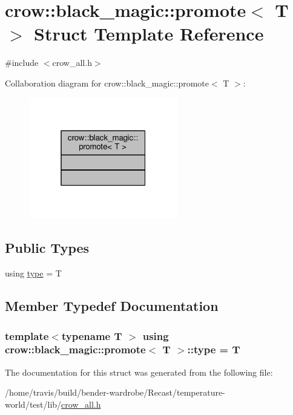 \hypertarget{structcrow_1_1black__magic_1_1promote}{\section{crow\-:\-:black\-\_\-magic\-:\-:promote$<$ T $>$ Struct Template Reference}
\label{structcrow_1_1black__magic_1_1promote}
}


{\ttfamily \#include $<$crow\-\_\-all.\-h$>$}



Collaboration diagram for crow\-:\-:black\-\_\-magic\-:\-:promote$<$ T $>$\-:
\nopagebreak
\begin{figure}[H]
\begin{center}
\leavevmode
\includegraphics[width=184pt]{structcrow_1_1black__magic_1_1promote__coll__graph}
\end{center}
\end{figure}
\subsection*{Public Types}
\begin{DoxyCompactItemize}
\item 
using \hyperlink{structcrow_1_1black__magic_1_1promote_a82cd625db63e2e5d3988ae220121cb32}{type} = T
\end{DoxyCompactItemize}


\subsection{Member Typedef Documentation}
\hypertarget{structcrow_1_1black__magic_1_1promote_a82cd625db63e2e5d3988ae220121cb32}{
\subsubsection[{type}]{\setlength{\rightskip}{0pt plus 5cm}template$<$typename T $>$ using {\bf crow\-::black\-\_\-magic\-::promote}$<$ T $>$\-::{\bf type} =  T}}\label{structcrow_1_1black__magic_1_1promote_a82cd625db63e2e5d3988ae220121cb32}


The documentation for this struct was generated from the following file\-:\begin{DoxyCompactItemize}
\item 
/home/travis/build/bender-\/wardrobe/\-Recast/temperature-\/world/test/lib/\hyperlink{crow__all_8h}{crow\-\_\-all.\-h}\end{DoxyCompactItemize}
